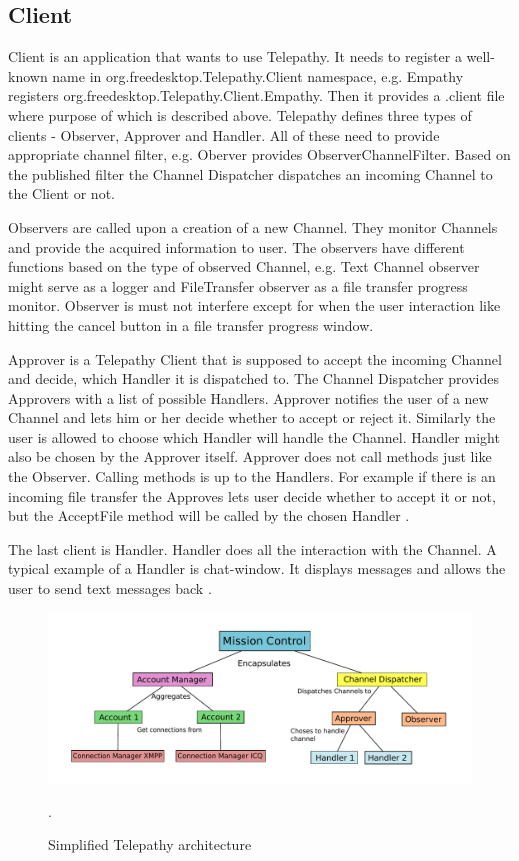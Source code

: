 \subsection*{Client}\label{subsect:tpClient}
Client is an application that wants to use Telepathy. It needs to register a well-known name in org.freedesktop.Telepathy.Client namespace, e.g. Empathy registers \newline org.freedesktop.Telepathy.Client.Empathy. Then it provides a .client file where purpose of which is described above. Telepathy defines three types of clients - Observer, Approver and Handler. All of these need to provide appropriate channel filter, e.g. Oberver provides ObserverChannelFilter. Based on the published filter the Channel Dispatcher dispatches an incoming Channel to the Client or not.\cite{TPWiki}  

Observers are called upon a creation of a new Channel. They monitor Channels and provide the acquired information to user. The observers have different functions based on the type of observed Channel, e.g. Text Channel observer might serve as a logger and FileTransfer observer as a file transfer progress monitor. Observer is must not interfere except for when the user interaction like hitting the cancel button in a file transfer progress window.\cite{TPWiki}     

Approver is a Telepathy Client that is supposed to accept the incoming Channel and decide, which Handler it is dispatched to. The Channel Dispatcher provides Approvers with a list of possible Handlers. Approver notifies the user of a new Channel and lets him or her decide whether to accept or reject it. Similarly the user is allowed to choose which Handler will handle the Channel. Handler might also be chosen by the Approver itself. Approver does not call methods just like the Observer. Calling methods is up to the Handlers. For example if there is an incoming file transfer the Approves lets user decide whether to accept it or not, but the AcceptFile method will be called by the chosen Handler \cite{TPWiki}.  

The last client is Handler. Handler does all the interaction with the Channel. A typical example of a Handler is chat-window. It displays messages and allows the user to send text messages back \cite{TPWiki}.  

\begin{figure}[ht]
	\begin{center}
	\includegraphics[width=15cm]{fig/telepathy-architecture.pdf}
	\caption{Simplified Telepathy architecture}.
	\label{fig:telelepathy-architecture}
\end{center}
\end{figure}

